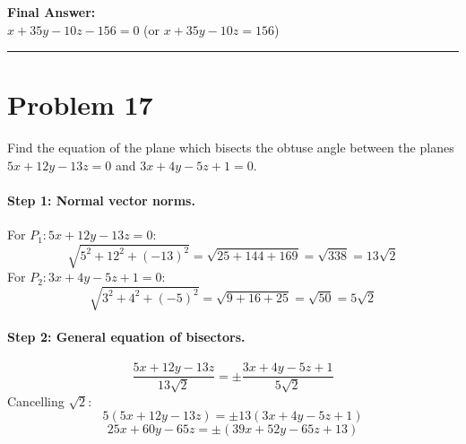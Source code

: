 \documentclass[11pt,a4paper]{article}
\begin{document}
\begin{resultbox}
\textbf{Final Answer:}\\
$\boxed{x + 35y - 10z - 156 = 0}$ \quad (or $x + 35y - 10z = 156$)
\end{resultbox}

\vspace{0.4cm}
\hrule
\vspace{0.4cm}

\section{Problem 17}
\begin{problembox}[Problem 17]
Find the equation of the plane which bisects the obtuse angle between the planes $5x + 12y - 13z = 0$ and $3x + 4y - 5z + 1 = 0$.
\end{problembox}

\paragraph{Step 1: Normal vector norms.}
For $P_1: 5x + 12y - 13z = 0$:
$$\sqrt{5^2 + 12^2 + (-13)^2} = \sqrt{25 + 144 + 169} = \sqrt{338} = 13\sqrt{2}$$
For $P_2: 3x + 4y - 5z + 1 = 0$:
$$\sqrt{3^2 + 4^2 + (-5)^2} = \sqrt{9 + 16 + 25} = \sqrt{50} = 5\sqrt{2}$$

\paragraph{Step 2: General equation of bisectors.}
$$\frac{5x + 12y - 13z}{13\sqrt{2}} = \pm \frac{3x + 4y - 5z + 1}{5\sqrt{2}}$$
Cancelling $\sqrt{2}$:
$$5(5x + 12y - 13z) = \pm 13(3x + 4y - 5z + 1)$$
$$25x + 60y - 65z = \pm (39x + 52y - 65z + 13)$$
\end{document}
